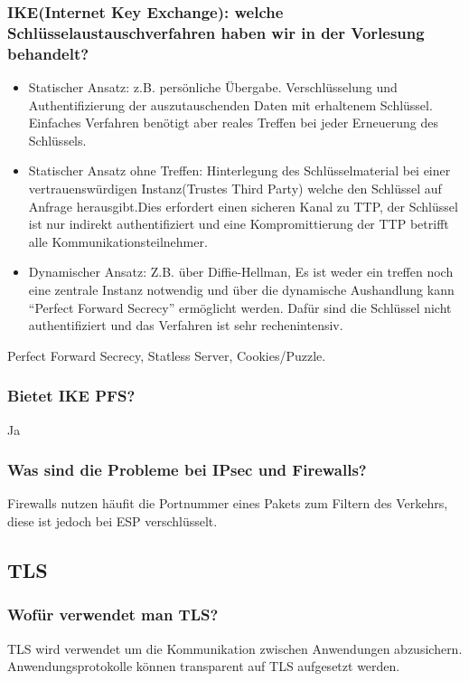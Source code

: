	\subsubsection{IKE(Internet Key Exchange): welche Schlüsselaustauschverfahren haben wir in der Vorlesung behandelt?}
	\begin{itemize}
		\item Statischer Ansatz: z.B. persönliche Übergabe. Verschlüsselung und Authentifizierung der auszutauschenden Daten mit erhaltenem Schlüssel. Einfaches Verfahren benötigt aber reales Treffen bei jeder Erneuerung des Schlüssels.
		\item Statischer Ansatz ohne Treffen: Hinterlegung des Schlüsselmaterial bei einer vertrauenswürdigen Instanz(Trustes Third Party) welche den Schlüssel auf Anfrage herausgibt.Dies erfordert einen sicheren Kanal zu TTP, der Schlüssel ist nur indirekt authentifiziert und eine Kompromittierung der TTP betrifft alle Kommunikationsteilnehmer.
		\item Dynamischer Ansatz: Z.B. über Diffie-Hellman, Es ist weder ein treffen noch eine zentrale Instanz notwendig und über die dynamische Aushandlung kann "`Perfect Forward Secrecy"' ermöglicht werden. Dafür sind die Schlüssel nicht authentifiziert und das Verfahren ist sehr rechenintensiv.
	\end{itemize}
	Perfect Forward Secrecy, Statless Server, Cookies/Puzzle.
	
	\subsubsection{Bietet IKE PFS?}
	Ja
	
	\subsubsection{Was sind die Probleme bei IPsec und Firewalls?}
	Firewalls nutzen häufit die Portnummer eines Pakets zum Filtern des Verkehrs, diese ist jedoch bei ESP verschlüsselt.
	
	
	
	
	

\subsection{TLS}
	\subsubsection{Wofür verwendet man TLS?}
	TLS wird verwendet um die Kommunikation zwischen Anwendungen abzusichern. Anwendungsprotokolle können transparent auf TLS aufgesetzt werden.
	
